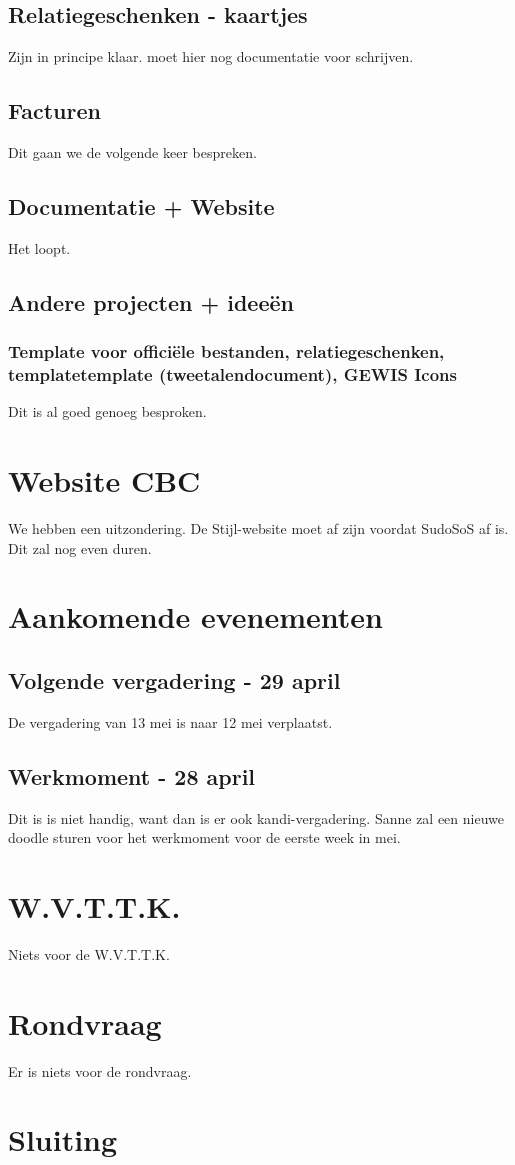 \documentclass[
dutch
]{GEWISMinutes}
\begin{document}
	\subsection{Relatiegeschenken - kaartjes}
	Zijn in principe klaar. \ava moet hier nog documentatie voor schrijven.
	
	\subsection{Facturen}
	Dit gaan we de volgende keer bespreken.
	
	\subsection{Documentatie + Website}
	Het loopt.
	
	\subsection{Andere projecten + idee\"en}
	
	\subsubsection{Template voor officiële bestanden, relatiegeschenken, templatetemplate (tweetalendocument), GEWIS Icons}
	Dit is al goed genoeg besproken. 
	
	\section{Website CBC}
	We hebben een uitzondering. De Stijl-website moet af zijn voordat SudoSoS af is. Dit zal nog even duren.
	
	\section{Aankomende evenementen}
	
	\subsection{Volgende vergadering - 29 april}
	De vergadering van 13 mei is naar 12 mei verplaatst.
	
	\subsection{Werkmoment - 28 april}
	Dit is is niet handig, want dan is er ook kandi-vergadering. Sanne zal een nieuwe doodle sturen voor het werkmoment voor de eerste week in mei.
	
	\section{W.V.T.T.K.}
	Niets voor de W.V.T.T.K.
	\section{Rondvraag}
	Er is niets voor de rondvraag.
	
	\section{Sluiting}
	\close{}
	
	\appendix
	\printActionlist
	\printDecisionlist
\end{document}

